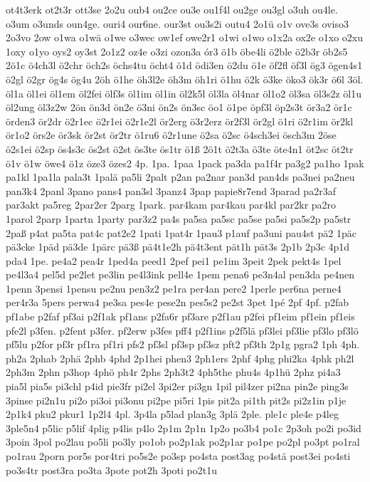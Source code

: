 {ot4t3erk
ot2t3r
ott3se
2o2u
oub4
ou2ce
ou3e
ou1f4l
ou2ge
ou3gl
o3uh
ou4le.
o3um
o3unds
oun4ge.
ouri4
our6ne.
our3st
ou3s2i
outu4
2o1ü
o1v
ove3s
oviso3
2o3vo
2ow
o1wa
o1wä
o1we
o3wec
ow1ef
owe2r1
o1wi
o1wo
o1x2a
ox2e
o1xo
o2xu
1oxy
o1yo
oys2
oy3st
2o1z2
oz4e
o3zi
ozon3a
ór3
ö1b
öbe4li
ö2ble
ö2b3r
öb2s5
2ö1c
ö4ch3l
ö2chr
öch2s
öchs4tu
öcht4
ö1d
ödi3en
ö2du
ö1e
öf2fl
öf3l
ög3
ögen4s1
ö2gl
ö2gr
ög4s
ög4u
2öh
ö1he
öh3l2e
öh3m
öh1ri
ö1hu
ö2k
ö3ke
öko3
ök3r
ö6l
3öl.
öl1a
öl1ei
öl1em
öl2fei
ölf3s
öl1im
öl1in
öl2k5l
öl3la
öl4nar
öl1o2
öl3sa
öl3s2z
öl1u
öl2ung
öl3z2w
2ön
ön3d
ön2e
ö3ni
ön2s
ön3sc
öo1
ö1pe
öpf3l
öp2s3t
ör3a2
ör1c
örden3
ör2dr
ö2r1ec
ö2r1ei
ö2r1e2l
ör2erg
ö3r2erz
ör2f3l
ör2gl
ö1ri
ö2r1im
ör2kl
ör1o2
örs2e
ör3sk
ör2st
ör2tr
ö1ru6
ö2r1une
ö2sa
ö2sc
ö4sch3ei
ösch3m
2öse
ö2s1ei
ö2sp
ös4s3c
ös2st
ö2st
ös3te
ös1tr
ö1ß
2ö1t
ö2t3a
ö3te
öte4n1
öt2sc
öt2tr
ö1v
ö1w
öwe4
ö1z
öze3
özes2
4p.
1pa.
1paa
1pack
pa3da
pa1f4r
pa3g2
pa1ho
1pak
pa1kl
1pa1la
pala3t
1palä
pa5li
2palt
p2an
pa2nar
pan3d
pan4ds
pa3nei
pa2neu
pan3k4
2panl
3pano
pans4
pan3sl
3panz4
3pap
papie8r7end
3parad
pa2r3af
par3akt
pa5reg
2par2er
2parg
1park.
par4kam
par4kau
par4kl
par2kr
pa2ro
1parol
2parp
1partn
1party
par3z2
pa4s
pa5sa
pa5sc
pa5se
pa5si
pa5s2p
pa5str
2paß
p4at
pa5ta
pat4c
pat2e2
1pati
1pat4r
1pau3
p1auf
pa3uni
pau4st
pä2
1päc
pä3cke
1päd
pä3de
1pärc
pä3ß
pä4t1e2h
pä4t3ent
pät1h
pät3s
2p1b
2p3c
4p1d
pda4
1pe.
pe4a2
pea4r
1ped4a
peed1
2pef
pei1
pe1im
3peit
2pek
pekt4s
1pel
pe4l3a4
pel5d
pe2let
pe3lin
pe4l3ink
pell4e
1pem
pena6
pe3n4al
pen3da
pe4nen
1penn
3pensi
1pensu
pe2nu
pen3z2
pe1ra
per4an
pere2
1perle
per6na
perne4
per4r3a
5pers
perwa4
pe3sa
pes4e
pese2n
pes5s2
pe2st
3pet
1pé
2pf
4pf.
p2fab
pf1abe
p2faf
pf3ai
p2f1ak
pf1ans
p2fa6r
pf3are
p2f1au
p2fei
pf1eim
pf1ein
pf1eis
pfe2l
p3fen.
p2fent
p3fer.
pf2erw
p3fes
pff4
p2f1ins
p2f5lä
pf3lei
pf3lie
pf3lo
pf3lö
pf5lu
p2for
pf3r
pf1ra
pf1ri
pfs2
pf3sl
pf3sp
pf3sz
pft2
pf3th
2p1g
pgra2
1ph
4ph.
ph2a
2phab
2phä
2phb
4phd
2p1hei
phen3
2ph1ers
2phf
4phg
phi2ka
4phk
ph2l
2ph3m
2phn
p3hop
4phö
ph4r
2phs
2ph3t2
4ph5the
phu4s
4p1hü
2phz
pi4a3
pia5l
pia5s
pi3chl
p4id
pie3fr
pi2el
3pi2er
pi3gn
1pil
pil4zer
pi2na
pin2e
ping3s
3pinse
pi2n1u
pi2o
pi3oi
pi3onu
pi2pe
pi5ri
1pis
pit2a
pi1th
pit2s
pi2z1in
p1je
2p1k4
pku2
pkur1
1p2l4
4pl.
3p4la
p5lad
plan3g
3plä
2ple.
ple1c
ple4e
p4leg
3ple5n4
p5lic
p5lif
4plig
p4lis
p4lo
2p1m
2p1n
1p2o
po3b4
po1c
2p3oh
po2i
po3id
3poin
3pol
po2lau
po5li
po3ly
po1ob
po2p1ak
po2p1ar
po1pe
po2pl
po3pt
po1ral
po1rau
2porn
por5s
por4tri
po5s2e
po3sp
po4sta
post3ag
po4stä
post3ei
po4sti
po3s4tr
post3ra
po3ta
3pote
pot2h
3poti
po2t1u
}
